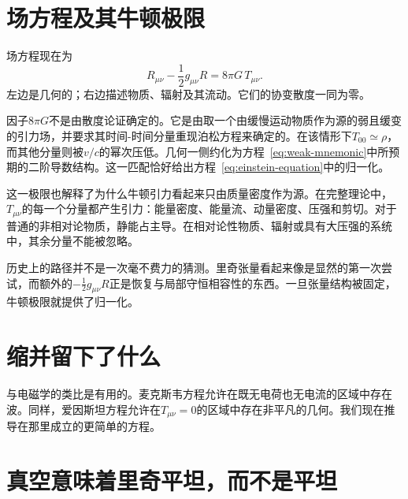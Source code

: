 \section{场方程及其牛顿极限}

场方程现在为
\begin{equation}
 \boxed{
 R_{\mu\nu}-\frac12 g_{\mu\nu}R
 =
 8\pi G\,T_{\mu\nu}
 }.
 \label{eq:einstein-equation}
\end{equation}
左边是几何的；右边描述物质、辐射及其流动。它们的协变散度一同为零。

因子\(8\pi G\)不是由散度论证确定的。它是由取一个由缓慢运动物质作为源的弱且缓变的引力场，并要求其时间-时间分量重现泊松方程来确定的。在该情形下\(T_{00}\simeq\rho\)，而其他分量则被\(v/c\)的幂次压低。几何一侧约化为方程~\eqref{eq:weak-mnemonic}中所预期的二阶导数结构。这一匹配恰好给出方程~\eqref{eq:einstein-equation}中的归一化。

这一极限也解释了为什么牛顿引力看起来只由质量密度作为源。在完整理论中，\(T_{\mu\nu}\)的每一个分量都产生引力：能量密度、能量流、动量密度、压强和剪切。对于普通的非相对论物质，静能占主导。在相对论性物质、辐射或具有大压强的系统中，其余分量不能被忽略。

历史上的路径并不是一次毫不费力的猜测。里奇张量看起来像是显然的第一次尝试，而额外的\(-\tfrac12g_{\mu\nu}R\)正是恢复与局部守恒相容性的东西。一旦张量结构被固定，牛顿极限就提供了归一化。

\section{缩并留下了什么}

\begin{classroomqa}
\end{classroomqa}

与电磁学的类比是有用的。麦克斯韦方程允许在既无电荷也无电流的区域中存在波。同样，爱因斯坦方程允许在\(T_{\mu\nu}=0\)的区域中存在非平凡的几何。我们现在推导在那里成立的更简单的方程。

\section{真空意味着里奇平坦，而不是平坦}


